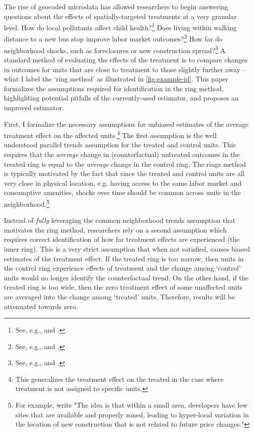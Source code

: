 \documentclass[12pt]{article}
\begin{document}
The rise of geocoded microdata has allowed researchers to begin answering questions about the effects of spatially-targeted treatments at a very granular level. How do local pollutants affect child health?\footnote{See, e.g., \citet{Currie_Davis_Greenstone_Walker_2015} and \citet{Marcus_2021}.} Does living within walking distance to a new bus stop improve labor market outcomes?\footnote{See, e.g., \citet{Gibbons_Machin_2005} and \citet{Billings_2011}.} How far do neighborhood shocks, such as foreclosures or new construction spread?\footnote{See, e.g., \citet{Asquith_Mast_Reed_2021,Cui_Walsh_2015,Gerardi_Rosenblatt_Willen_Yao_2015} and \citet{Campbell_Giglio_Pathak_2011}.} A standard method of evaluating the effects of the treatment is to compare changes in outcomes for units that are close to treatment to those slightly further away -- what I label the `ring method' as illustrated in \autoref{fig:example-id}. This paper formalizes the assumptions required for identification in the ring method, highlighting potential pitfalls of the currently-used estimator, and proposes an improved estimator. 

First, I formalize the necessary assumptions for unbiased estimates of the average treatment effect on the affected units.\footnote{This generalizes the treatment effect on the treated in the case where treatment is not assigned to specific units.} The first assumption is the well understood parallel trends assumption for the treated and control units. This requires that the \emph{average} change in (counterfactual) untreated outcomes in the treated ring is equal to the \emph{average} change in the control ring. The rings method is typically motivated by the fact that since the treated and control units are all very close in physical location, e.g. having access to the same labor market and consumptive amenities, shocks over time should be common across units in the neighborhood.\footnote{For example, \citet{Asquith_Mast_Reed_2021} write "The idea is that within a small area, developers have few sites that are available and properly zoned, leading to hyper-local variation in the location of new construction that is not related to future price changes."} 

Instead of \emph{fully} leveraging the common neighborhood trends assumption that motivates the ring method, researchers rely on a second assumption which requires correct identification of how far treatment effects are experienced (the inner ring). This is a very strict assumption that when not satisfied, causes biased estimates of the treatment effect. If the treated ring is too narrow, then units in the control ring experience effects of treatment and the change among `control' units would no longer identify the counterfactual trend. On the other hand, if the treated ring is too wide, then the zero treatment effect of some unaffected units are averaged into the change among `treated' units. Therefore, results will be attenuated towards zero.
\end{document}
